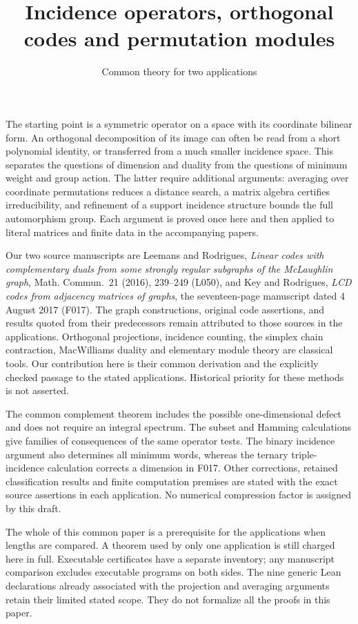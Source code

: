 \documentclass[11pt,a4paper]{article}
\title{Incidence operators, orthogonal codes and permutation modules}
\author{Common theory for two applications}
\date{}
\numberwithin{equation}{section}
\begin{document}
\maketitle

The starting point is a symmetric operator on a space with its coordinate
bilinear form. An orthogonal decomposition of its image can often be
read from a short polynomial identity, or transferred from a much smaller
incidence space. This separates the questions of dimension and duality
from the questions of minimum weight and group action. The latter require
additional arguments: averaging over coordinate permutations reduces a
distance search, a matrix algebra certifies irreducibility, and refinement
of a support incidence structure bounds the full automorphism group.
Each argument is proved once here and then applied to literal matrices
and finite data in the accompanying papers.

Our two source manuscripts are Leemans and Rodrigues,
\emph{Linear codes with complementary duals from some strongly regular
subgraphs of the McLaughlin graph}, Math. Commun.\ 21 (2016), 239--249
(L050), and Key and Rodrigues, \emph{LCD codes from adjacency matrices of
graphs}, the seventeen-page manuscript dated 4 August 2017 (F017).
The graph constructions, original code assertions, and results quoted
from their predecessors remain attributed to those sources in the
applications. Orthogonal projections, incidence counting, the simplex
chain contraction, MacWilliams duality and elementary module theory are
classical tools. Our contribution here is their common derivation and
the explicitly checked passage to the stated applications. Historical
priority for these methods is not asserted.

The common complement theorem includes the possible one-dimensional
defect and does not require an integral spectrum. The subset and Hamming
calculations give families of consequences of the same operator tests.
The binary incidence argument also determines all minimum words, whereas
the ternary triple-incidence calculation corrects a dimension in F017.
Other corrections, retained classification results and finite computation
premises are stated with the exact source assertions in each application.
No numerical compression factor is assigned by this draft.

The whole of this common paper is a prerequisite for the applications
when lengths are compared. A theorem used by only one application is
still charged here in full. Executable certificates have a separate
inventory; any manuscript comparison excludes executable programs on
both sides. The nine generic Lean declarations already associated with
the projection and averaging arguments retain their limited stated
scope. They do not formalize all the proofs in this paper.
\end{document}
